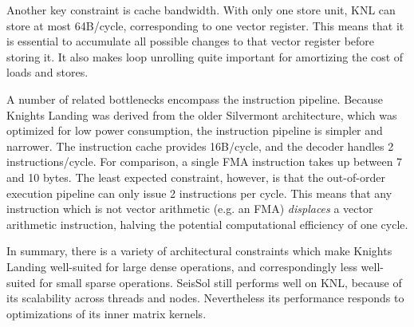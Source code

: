 Another key constraint is cache bandwidth. With only one store unit, KNL can store at most 64B/cycle, corresponding to one vector register. This means that it is essential to accumulate all possible changes to that vector register before storing it. It also makes loop unrolling quite important for amortizing the cost of loads and stores.

A number of related bottlenecks encompass the instruction pipeline. Because Knights Landing was derived from the older Silvermont architecture, which was optimized for low power consumption, the instruction pipeline is simpler and narrower. The instruction cache provides 16B/cycle, and the decoder handles 2 instructions/cycle. For comparison, a single \gls{FMA} instruction takes up between 7 and 10 bytes. The least expected constraint, however, is that the out-of-order execution pipeline can only issue 2 instructions per cycle. This means that any instruction which is not vector arithmetic (e.g. an FMA) \emph{displaces} a vector arithmetic instruction, halving the potential computational efficiency of one cycle.

In summary, there is a variety of architectural constraints which make Knights Landing well-suited for large dense operations, and correspondingly less well-suited for small sparse operations. SeisSol still performs well on KNL, because of its scalability across threads and nodes. Nevertheless its performance responds to optimizations of its inner matrix kernels.

